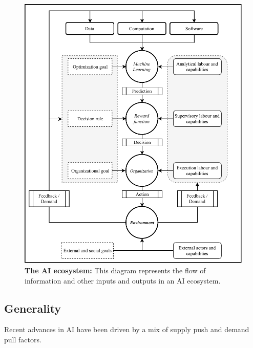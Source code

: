 \documentclass[11pt]{article}
\begin{document}
\begin{figure}
    \centering
    \includegraphics{ai_diagram.pdf}
    \caption{\textbf{The AI ecosystem:} This diagram represents the flow of information and other inputs and outputs in an AI ecosystem.}
    \label{fig:ecosystem}
\end{figure}

\subsection{Generality}
\label{subsec:general}
Recent advances in AI have been driven by a mix of supply push and demand pull factors. 
\end{document}
